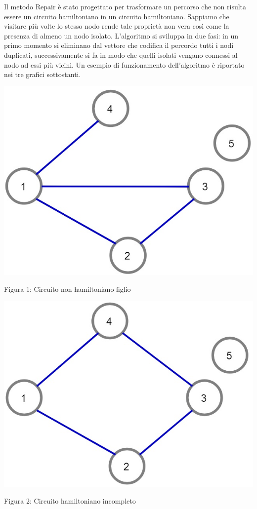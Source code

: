 \documentclass[11pt]{article}
\begin{document}
Il metodo Repair è stato progettato per trasformare un percorso che non risulta essere un circuito hamiltoniano in un circuito hamiltoniano. Sappiamo che visitare più volte lo stesso nodo rende tale proprietà non vera così come la presenza di almeno un nodo isolato. L'algoritmo si sviluppa in due fasi: in un primo momento si eliminano dal vettore che codifica il percordo tutti i nodi duplicati, successivamente si fa in modo che quelli isolati vengano connessi al nodo ad essi più vicini. Un esempio di funzionamento dell'algoritmo è riportato nei tre grafici sottostanti.

\begin{center}
\includegraphics[scale=0.5]{circuitoF}

Figura 1: Circuito non hamiltoniano figlio
\end{center}

\begin{center}
\includegraphics[scale=0.5]{circuitoH}  

Figura 2: Circuito hamiltoniano incompleto
\end{center}
\end{document}
